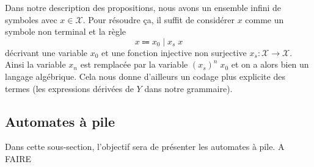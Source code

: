 \begin{remark}
  Dans notre description des propositions, nous avons un ensemble infini de
  symboles avec $x \in \mathcal X$. Pour résoudre ça, il suffit de considérer
  $x$ comme un symbole non terminal et la règle
  \[x \Coloneq x_0\mid x_s\;x\]
  décrivant une variable $x_0$ et une fonction injective non surjective
  $x_s : \mathcal X \to \mathcal X$. Ainsi la variable $x_n$ est remplacée par
  la variable $(x_s)^n\;x_0$ et on a alors bien un langage algébrique. Cela
  nous donne d'ailleurs un codage plus explicite des termes (les expressions
  dérivées de $Y$ dans notre grammaire).
\end{remark}

\subsection{Automates à pile}

Dans cette sous-section, l'objectif sera de présenter les automates à pile.
A FAIRE
